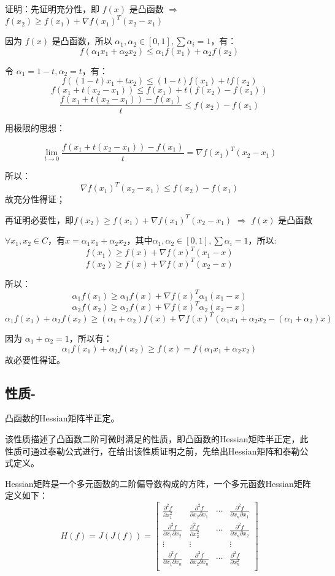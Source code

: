 \documentclass[12pt]{article}
\begin{document}
\begin{framed}  
\small{
证明：先证明充分性，即 $f(x)$ 是凸函数 $\Rightarrow$ $f(x_2) \ge f(x_1) + \nabla f(x_1)^T(x_2-x_1)$

因为 $f(x)$ 是凸函数，所以 $\alpha_1, \alpha_2 \in [0,1], \sum\alpha_i = 1$，有：
$$
f(\alpha_1x_1 + \alpha_2x_2) \le \alpha_1f(x_1) + \alpha_2f(x_2)
$$

令 $\alpha_1 = 1 - t, \alpha_2 = t$，有：
$$
f((1-t)x_1 + tx_2) \le (1-t)f(x_1) + tf(x_2)
$$
$$
f(x_1 + t(x_2-x_1)) \le f(x_1) + t(f(x_2) - f(x_1))
$$
$$
\frac{f(x_1 + t(x_2-x_1)) - f(x_1)}{t} \le f(x_2) - f(x_1)
$$

用极限的思想：

$$\lim_{t \to 0}\frac{f(x_1 + t(x_2-x_1)) - f(x_1)}{t} = \nabla f(x_1)^T(x_2 - x_1)$$

所以：
$$
\nabla f(x_1)^T(x_2 - x_1) \le f(x_2) - f(x_1)
$$
故充分性得证；

再证明必要性，即$f(x_2) \ge f(x_1) + \nabla f(x_1)^T(x_2-x_1)$ $\Rightarrow$  $f(x)$ 是凸函数

$\forall x_1, x_2 \in C$，有$x = \alpha_1x_1 + \alpha_2x_2$，其中$\alpha_1, \alpha_2 \in [0,1], \sum\alpha_i = 1$，所以:
$$
f(x_1) \ge f(x) + \nabla f(x)^T(x_1-x) 
$$
$$
f(x_2) \ge f(x) + \nabla f(x)^T(x_2-x) 
$$

所以：
$$
\alpha_1f(x_1) \ge \alpha_1f(x) + \nabla f(x)^T\alpha_1(x_1-x) 
$$
$$
\alpha_2f(x_2) \ge \alpha_2f(x) + \nabla f(x)^T\alpha_2(x_2-x) 
$$
$$
\alpha_1f(x_1) + \alpha_2f(x_2) \ge (\alpha_1+\alpha_2)f(x) + \nabla f(x)^T(\alpha_1x_1 + \alpha_2x_2 - (\alpha_1+\alpha_2)x)
$$

因为 $\alpha_1 + \alpha_2 = 1$，所以有：
$$
\alpha_1f(x_1) + \alpha_2f(x_2) \ge f(x) = f(\alpha_1x_1 + \alpha_2x_2)
$$
故必要性得证。
}
\end{framed}

\subsection{性质-}
凸函数的Hessian矩阵半正定。

该性质描述了凸函数二阶可微时满足的性质，即凸函数的Hessian矩阵半正定，此性质可通过泰勒公式进行，在给出该性质证明之前，先给出Hessian矩阵和泰勒公式定义。

Hessian矩阵是一个多元函数的二阶偏导数构成的方阵，一个多元函数Hessian矩阵定义如下：
$$
H(f) = J(J(f)) =
\begin{bmatrix}
\frac{\partial^2 f}{\partial x_1^2} & \frac{\partial^2 f}{\partial x_2\partial x_1} & \cdots & \frac{\partial^2 f}{\partial x_n\partial x_1}  \\
\frac{\partial^2 f}{\partial x_1\partial x_2} & \frac{\partial^2 f}{\partial x_2^2} & \cdots & \frac{\partial^2 f}{\partial x_n\partial x_2}  \\
\vdots & \vdots &  & \vdots \\
\frac{\partial^2 f}{\partial x_1\partial x_n} & \frac{\partial^2 f}{\partial x_2\partial x_n} & \cdots & \frac{\partial^2 f}{\partial x_n^2}  \\
\end{bmatrix}
$$
\end{document}
